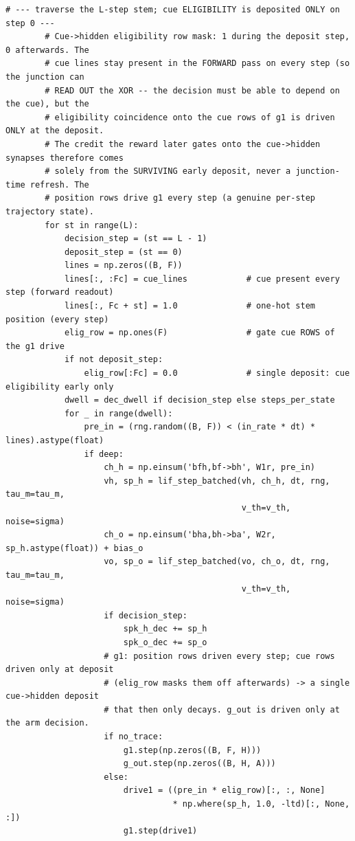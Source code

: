 \begin{lstlisting}[caption={mrl\_trace/distal\_cue.py},label={lst:siox-src-distal_cue}]
        # --- traverse the L-step stem; cue ELIGIBILITY is deposited ONLY on step 0 ---
        # Cue->hidden eligibility row mask: 1 during the deposit step, 0 afterwards. The
        # cue lines stay present in the FORWARD pass on every step (so the junction can
        # READ OUT the XOR -- the decision must be able to depend on the cue), but the
        # eligibility coincidence onto the cue rows of g1 is driven ONLY at the deposit.
        # The credit the reward later gates onto the cue->hidden synapses therefore comes
        # solely from the SURVIVING early deposit, never a junction-time refresh. The
        # position rows drive g1 every step (a genuine per-step trajectory state).
        for st in range(L):
            decision_step = (st == L - 1)
            deposit_step = (st == 0)
            lines = np.zeros((B, F))
            lines[:, :Fc] = cue_lines            # cue present every step (forward readout)
            lines[:, Fc + st] = 1.0              # one-hot stem position (every step)
            elig_row = np.ones(F)                # gate cue ROWS of the g1 drive
            if not deposit_step:
                elig_row[:Fc] = 0.0              # single deposit: cue eligibility early only
            dwell = dec_dwell if decision_step else steps_per_state
            for _ in range(dwell):
                pre_in = (rng.random((B, F)) < (in_rate * dt) * lines).astype(float)
                if deep:
                    ch_h = np.einsum('bfh,bf->bh', W1r, pre_in)
                    vh, sp_h = lif_step_batched(vh, ch_h, dt, rng, tau_m=tau_m,
                                                v_th=v_th, noise=sigma)
                    ch_o = np.einsum('bha,bh->ba', W2r, sp_h.astype(float)) + bias_o
                    vo, sp_o = lif_step_batched(vo, ch_o, dt, rng, tau_m=tau_m,
                                                v_th=v_th, noise=sigma)
                    if decision_step:
                        spk_h_dec += sp_h
                        spk_o_dec += sp_o
                    # g1: position rows driven every step; cue rows driven only at deposit
                    # (elig_row masks them off afterwards) -> a single cue->hidden deposit
                    # that then only decays. g_out is driven only at the arm decision.
                    if no_trace:
                        g1.step(np.zeros((B, F, H)))
                        g_out.step(np.zeros((B, H, A)))
                    else:
                        drive1 = ((pre_in * elig_row)[:, :, None]
                                  * np.where(sp_h, 1.0, -ltd)[:, None, :])
                        g1.step(drive1)

\end{lstlisting}
